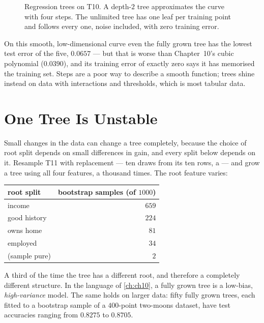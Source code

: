 \begin{figure}[htbp]
  \caption{Regression trees on T10. A depth-$2$ tree approximates the curve with
  four steps. The unlimited tree has one leaf per training point and follows
  every one, noise included, with zero training error.}
  \label{fig:reg-tree}
\end{figure}

On this smooth, low-dimensional curve even the fully grown tree has the lowest
test error of the five, $0.0657$ --- but that is worse than Chapter~10's cubic
polynomial ($0.0390$), and its training error of exactly zero says it has
memorised the training set. Steps are a poor way to describe a smooth function;
trees shine instead on data with interactions and thresholds, which is most
tabular data.

\section{One Tree Is Unstable}
\label{sec:instability}

Small changes in the data can change a tree completely, because the choice of
root split depends on small differences in gain, and every split below depends on
it. Resample T11 with replacement --- ten draws from its ten rows, a
 --- and grow a tree using all four features, a thousand
times. The root feature varies:

\begin{center}
\small
\renewcommand{\arraystretch}{1.12}
\begin{tabular}{@{}lr@{}}
\toprule
root split & bootstrap samples (of $1000$)\\
\midrule
income        & $659$\\
good history  & $224$\\
owns home     & $81$\\
employed      & $34$\\
(sample pure) & $2$\\
\bottomrule
\end{tabular}
\end{center}

A third of the time the tree has a different root, and therefore a completely
different structure. In the language of \cref{ch:ch10}, a fully grown tree is a
low-bias, \emph{high-variance} model. The same holds on larger data: fifty fully
grown trees, each fitted to a bootstrap sample of a $400$-point two-moons
dataset, have test accuracies ranging from $0.8275$ to $0.8705$.


